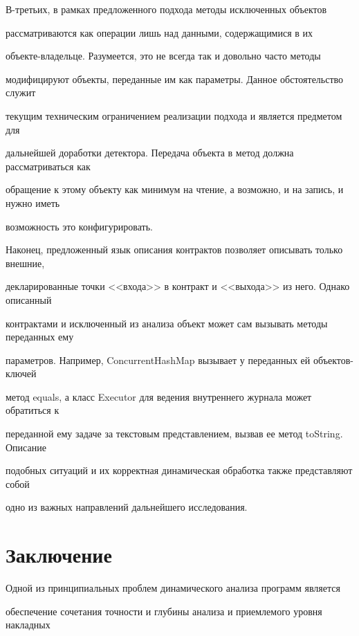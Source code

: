  В-третьих, в рамках предложенного подхода методы исключенных объектов

рассматриваются как операции лишь над данными, содержащимися в их

  объ\-ек\-те-вла\-дель\-це. Разумеется, это не всегда так и довольно часто методы

модифицируют объекты, переданные им как параметры. Данное обстоятельство служит

текущим техническим ограничением реализации подхода и является предметом для

дальнейшей доработки детектора. Передача объекта в метод должна рассматриваться как

обращение к этому объекту как минимум на чтение, а возможно, и на запись, и нужно иметь

возможность это конфигурировать.



  Наконец, предложенный язык описания контрактов позволяет описывать только внешние,

декларированные точки <<входа>> в контракт и <<выхода>> из него. Однако описанный

контрактами и исключенный из анализа объект может сам вызывать методы переданных ему

параметров. Например, {\sf ConcurrentHashMap} вызывает у переданных ей объ\-ек\-тов-клю\-чей

метод {\sf equals}, а класс {\sf Executor} для ведения внутреннего журнала может обратиться к

переданной ему задаче за текстовым представлением, вызвав ее метод {\sf toString}. Описание

подобных ситуаций и их корректная динамическая обработка также представляют собой

одно из важных направлений дальнейшего исследо\-вания.

{



}



\section{Заключение}



  Одной из принципиальных проблем динамического анализа программ является

обеспечение сочетания точности и глубины анализа и приемлемого уровня накладных

